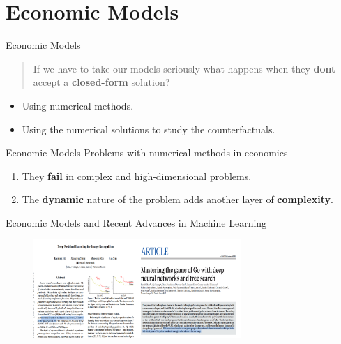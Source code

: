 \documentclass[aspectratio=169,10pt]{beamer}
\newcommand{\emphcolor}[1]{\textbf{\textcolor{emphcolorval}{#1}}}
\begin{document}
\section{Economic Models}

\begin{frame}{Economic Models}
	 \begin{quote}
	 	If we have to take our models seriously what happens when they \emphcolor{dont} accept a \emphcolor{closed-form} solution?
	 \end{quote}
	 
	 \begin{itemize}
	 	\item Using numerical methods.
	 	\vspace{0.025in}
	 	\item Using the numerical solutions to study the counterfactuals.
	 \end{itemize}
	 
\end{frame}

\begin{frame}{Economic Models}
Problems with numerical methods in economics
	\begin{enumerate}
		\item They \emphcolor{fail} in complex and high-dimensional problems.
		\vspace{0.025in}
		\item The \emphcolor{dynamic} nature of the problem adds another layer of \emphcolor{complexity}.
	\end{enumerate}
\end{frame}

\begin{frame}{Economic Models and Recent Advances in Machine Learning}
		\begin{figure}[t!]
			\centering
			\includegraphics[width=0.7\textwidth]{figs/deep_learning}
		\end{figure}
\end{frame}
\end{document}

